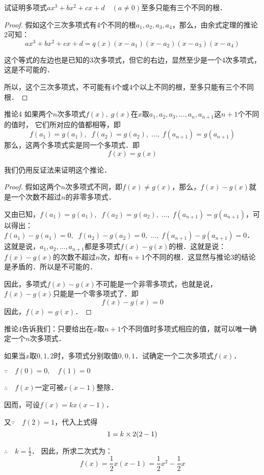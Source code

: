 \begin{example}
    试证明多项式$ax^3+bx^2+cx+d\quad (a\ne 0)$至多只能有三个不同的根．
\end{example}


\begin{proof}
    假如这个三次多项式有4个不同的根$a_1,a_2,a_3,a_4$，那么，由余式定理的推论2可知：
\[ax^3+bx^2+cx+d=q (x) (x-a_1) (x-a_2) (x-a_3) (x-a_4)\]

这个等式的左边也是已知的3次多项式，但它的右边，显然至少是一个4次多项式，这是不可能的．

所以，这个三次多项式，不可能有4个或4个以上不同的根，至多只能有三个不同根．
\end{proof}


\begin{blk}{推论4}
    如果两个$n$次多项式$f(x),\; g(x)$在$x$取$a_1,a_2,a_3,\ldots,a_n,a_{n+1}$这$n+1$个不同的值时，
    它们所对应的值都相等，即
\[f (a_1) =g (a_1) ,\; \; f (a_2) =g (a_2) ,\;  \ldots,\;  f (a_{n+1}) =g (a_{n+1}) \]
那么，这两个多项式实是同一个多项式．即
\[f (x) =g (x) \]
\end{blk}

我们仍用反证法来证明这个推论．

\begin{proof}
假如这两个$n$次多项式不同，即$f(x)\ne g(x)$，那么，$f(x)-g(x)$就是一个次数不超过$n$的非零多项式．

又由已知，$f (a_1) =g (a_1) ,\; \; f (a_2) =g (a_2) ,\;  \ldots,\;  f (a_{n+1}) =g (a_{n+1})$，可以得出：$f (a_1) -g (a_1)=0 ,\; \; f (a_2) -g (a_2)=0 ,\;  \ldots,\;  f (a_{n+1}) -g (a_{n+1})=0$．这就是说，$a_1,a_2,\ldots,a_{n+1}$都是多项式$f(x)-g(x)$的根．这就是说：$f(x)-g(x)$的次数不超过$n$次，却有$n+1$个不同的根．这显然与推论3的结论是矛盾的．所以是不可能的．

因此，多项式$f(x)-g(x)$不可能是一个非零多项式，也就是说，$f(x)-g(x)$只能是一个零多项式了．即
\[f (x) -g (x) =0\]
因此，$f(x)=g(x)$．

\end{proof}

推论4告诉我们：只要给出在$x$取$n+1$个不同值时多项式相应的值，就可以唯一确定一个$n$次多项式．

\begin{example}
如果当$x$取$0, 1, 2$时，多项式分别取值$0,0,1$．试确定一个二次多项式$f(x)$．
\end{example}


\begin{solution}
$\because\quad f(0)=0,\quad f(1)=0$

$\therefore\quad f(x)$一定可被$x(x-1)$整除．

因而，可设$f(x)=kx(x-1)$．

又$\because\quad f(2)=1$，代入上式得
\[1=k\times2 (2-1) \]

$\therefore\quad k=\frac{1}{2}$．
因此，所求二次式为：
\[f(x)=\frac{1}{2}x(x-1)=\frac{1}{2}x^2-\frac{1}{2}x\]
\end{solution}

